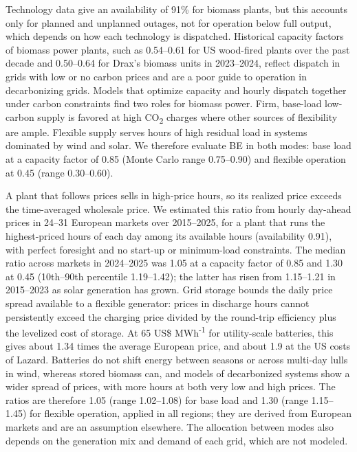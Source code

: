 \documentclass[
  letterpaper,
  twoside,
  twocolumn,
  9pt]{article}
\begin{document}
Technology data give an availability of 91\% for biomass
plants,\citep{dea2026} but this accounts only for planned and unplanned
outages, not for operation below full output, which depends on how each
technology is dispatched. Historical capacity factors of biomass power
plants, such as 0.54--0.61 for US wood-fired plants over the past decade
\citep{eia2026epm} and 0.50--0.64 for Drax's biomass units in
2023--2024,\citep{drax2025} reflect dispatch in grids with low or no
carbon prices and are a poor guide to operation in decarbonizing grids.
Models that optimize capacity and hourly dispatch together under carbon
constraints find two roles for biomass power. Firm, base-load low-carbon
supply \citep{daggash2019, prado2023} is favored at high
CO\textsubscript{2} charges where other sources of flexibility are
ample.\citep{ahlstrom2022} Flexible supply serves hours of high residual
load in systems dominated by wind and
solar.\citep{johansson2019, lehtveer2021} We therefore evaluate BE in
both modes: base load at a capacity factor of 0.85 (Monte Carlo range
0.75--0.90) and flexible operation at 0.45 (range 0.30--0.60).

A plant that follows prices sells in high-price hours, so its realized
price exceeds the time-averaged wholesale price. We estimated this ratio
from hourly day-ahead prices in 24--31 European markets over
2015--2025,\citep{ember2026hourly} for a plant that runs the
highest-priced hours of each day among its available hours (availability
0.91), with perfect foresight and no start-up or minimum-load
constraints. The median ratio across markets in 2024--2025 was 1.05 at a
capacity factor of 0.85 and 1.30 at 0.45 (10th--90th percentile
1.19--1.42); the latter has risen from 1.15--1.21 in 2015--2023 as solar
generation has grown. Grid storage bounds the daily price spread
available to a flexible generator: prices in discharge hours cannot
persistently exceed the charging price divided by the round-trip
efficiency plus the levelized cost of storage. At 65 US\$
MWh\textsuperscript{-1} for utility-scale
batteries,\citep{ember2025battery} this gives about 1.34 times the
average European price, and about 1.9 at the US costs of
Lazard\citep{lazard2025}. Batteries do not shift energy between seasons
or across multi-day lulls in wind, whereas stored biomass can, and
models of decarbonized systems show a wider spread of prices, with more
hours at both very low and high prices.\citep{geis2025} The ratios are
therefore 1.05 (range 1.02--1.08) for base load and 1.30 (range
1.15--1.45) for flexible operation, applied in all regions; they are
derived from European markets and are an assumption elsewhere. The
allocation between modes also depends on the generation mix and demand
of each grid, which are not modeled.
\end{document}
